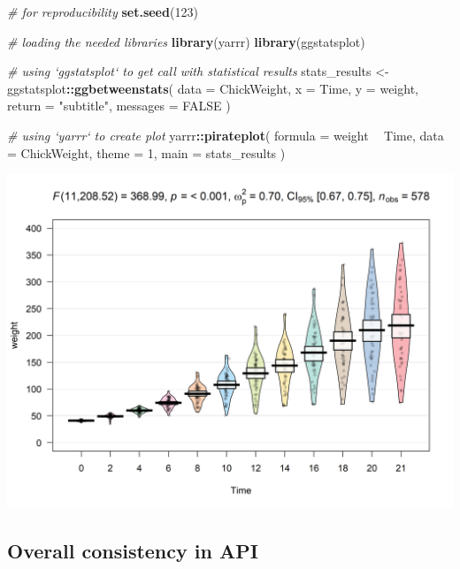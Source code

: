 \documentclass[]{article}
\newenvironment{Shaded}{\begin{snugshade}}{\end{snugshade}}
\newcommand{\CommentTok}[1]{\textcolor[rgb]{0.56,0.35,0.01}{\textit{#1}}}
\newcommand{\DataTypeTok}[1]{\textcolor[rgb]{0.13,0.29,0.53}{#1}}
\newcommand{\DecValTok}[1]{\textcolor[rgb]{0.00,0.00,0.81}{#1}}
\newcommand{\KeywordTok}[1]{\textcolor[rgb]{0.13,0.29,0.53}{\textbf{#1}}}
\newcommand{\NormalTok}[1]{#1}
\newcommand{\OperatorTok}[1]{\textcolor[rgb]{0.81,0.36,0.00}{\textbf{#1}}}
\newcommand{\OtherTok}[1]{\textcolor[rgb]{0.56,0.35,0.01}{#1}}
\newcommand{\StringTok}[1]{\textcolor[rgb]{0.31,0.60,0.02}{#1}}
\begin{document}
\begin{Shaded}
\begin{Highlighting}[]
\CommentTok{# for reproducibility}
\KeywordTok{set.seed}\NormalTok{(}\DecValTok{123}\NormalTok{)}

\CommentTok{# loading the needed libraries}
\KeywordTok{library}\NormalTok{(yarrr)}
\KeywordTok{library}\NormalTok{(ggstatsplot)}

\CommentTok{# using `ggstatsplot` to get call with statistical results}
\NormalTok{stats_results <-}
\StringTok{  }\NormalTok{ggstatsplot}\OperatorTok{::}\KeywordTok{ggbetweenstats}\NormalTok{(}
    \DataTypeTok{data =}\NormalTok{ ChickWeight,}
    \DataTypeTok{x =}\NormalTok{ Time,}
    \DataTypeTok{y =}\NormalTok{ weight,}
    \DataTypeTok{return =} \StringTok{"subtitle"}\NormalTok{,}
    \DataTypeTok{messages =} \OtherTok{FALSE}
\NormalTok{  )}

\CommentTok{# using `yarrr` to create plot}
\NormalTok{yarrr}\OperatorTok{::}\KeywordTok{pirateplot}\NormalTok{(}
  \DataTypeTok{formula =}\NormalTok{ weight }\OperatorTok{~}\StringTok{ }\NormalTok{Time,}
  \DataTypeTok{data =}\NormalTok{ ChickWeight,}
  \DataTypeTok{theme =} \DecValTok{1}\NormalTok{,}
  \DataTypeTok{main =}\NormalTok{ stats_results}
\NormalTok{)}
\end{Highlighting}
\end{Shaded}

\includegraphics[width=1\linewidth]{./figures/paper-pirateplot-1}

\hypertarget{overall-consistency-in-api}{%
\subsection{Overall consistency in API}\label{overall-consistency-in-api}}
\end{document}
